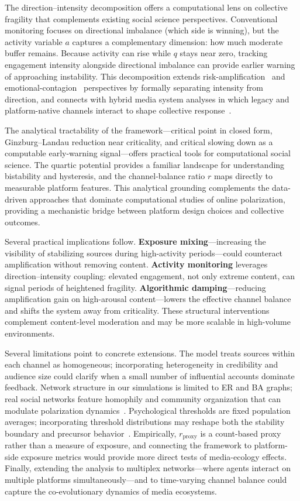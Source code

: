 \documentclass[12pt]{article}
\begin{document}
The direction--intensity decomposition offers a computational lens on collective fragility that complements existing social science perspectives. Conventional monitoring focuses on directional imbalance (which side is winning), but the activity variable $a$ captures a complementary dimension: how much moderate buffer remains. Because activity can rise while $q$ stays near zero, tracking engagement intensity alongside directional imbalance can provide earlier warning of approaching instability. This decomposition extends risk-amplification~\cite{Kasperson1988} and emotional-contagion~\cite{Kramer2014,Fan2014,Brady2023} perspectives by formally separating intensity from direction, and connects with hybrid media system analyses in which legacy and platform-native channels interact to shape collective response~\cite{Chadwick2017}.

The analytical tractability of the framework---critical point in closed form, Ginzburg--Landau reduction near criticality, and critical slowing down as a computable early-warning signal---offers practical tools for computational social science. The quartic potential provides a familiar landscape for understanding bistability and hysteresis, and the channel-balance ratio $r$ maps directly to measurable platform features. This analytical grounding complements the data-driven approaches that dominate computational studies of online polarization, providing a mechanistic bridge between platform design choices and collective outcomes.

Several practical implications follow. \textbf{Exposure mixing}---increasing the visibility of stabilizing sources during high-activity periods---could counteract amplification without removing content. \textbf{Activity monitoring} leverages direction--intensity coupling: elevated engagement, not only extreme content, can signal periods of heightened fragility. \textbf{Algorithmic damping}---reducing amplification gain on high-arousal content---lowers the effective channel balance and shifts the system away from criticality. These structural interventions complement content-level moderation and may be more scalable in high-volume environments.

Several limitations point to concrete extensions. The model treats sources within each channel as homogeneous; incorporating heterogeneity in credibility and audience size could clarify when a small number of influential accounts dominate feedback. Network structure in our simulations is limited to ER and BA graphs; real social networks feature homophily and community organization that can modulate polarization dynamics~\cite{McPherson2001,Dandekar2013}. Psychological thresholds are fixed population averages; incorporating threshold distributions may reshape both the stability boundary and precursor behavior~\cite{Schwartz2013,Pfefferbaum2020}. Empirically, $r_{\text{proxy}}$ is a count-based proxy rather than a measure of exposure, and connecting the framework to platform-side exposure metrics would provide more direct tests of media-ecology effects. Finally, extending the analysis to multiplex networks---where agents interact on multiple platforms simultaneously---and to time-varying channel balance could capture the co-evolutionary dynamics of media ecosystems.
\end{document}
